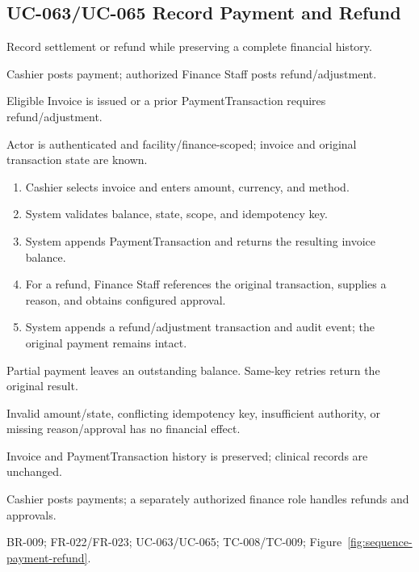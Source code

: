 \documentclass[a4paper,12pt]{article}
\begin{document}
\subsection{UC-063/UC-065 Record Payment and Refund}
\begin{description}[leftmargin=2.6cm,style=nextline]
\item[Goal] Record settlement or refund while preserving a complete financial history.
\item[Primary actors] Cashier posts payment; authorized Finance Staff posts refund/adjustment.
\item[Trigger] Eligible Invoice is issued or a prior PaymentTransaction requires refund/adjustment.
\item[Preconditions] Actor is authenticated and facility/finance-scoped; invoice and original transaction state are known.
\item[Main success flow]
\begin{enumerate}[leftmargin=1.4em]
  \item Cashier selects invoice and enters amount, currency, and method.
  \item System validates balance, state, scope, and idempotency key.
  \item System appends PaymentTransaction and returns the resulting invoice balance.
  \item For a refund, Finance Staff references the original transaction, supplies a reason, and obtains configured approval.
  \item System appends a refund/adjustment transaction and audit event; the original payment remains intact.
\end{enumerate}
\item[Alternative flows] Partial payment leaves an outstanding balance. Same-key retries return the original result.
\item[Exception flows] Invalid amount/state, conflicting idempotency key, insufficient authority, or missing reason/approval has no financial effect.
\item[Postconditions and data] Invoice and PaymentTransaction history is preserved; clinical records are unchanged.
\item[Authorization] Cashier posts payments; a separately authorized finance role handles refunds and approvals.
\item[Trace] BR-009; FR-022/FR-023; UC-063/UC-065; TC-008/TC-009; Figure~\ref{fig:sequence-payment-refund}.
\end{description}
\end{document}
